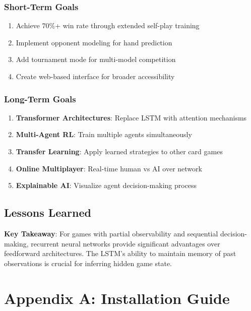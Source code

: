 \documentclass[12pt,a4paper]{article}
\begin{document}
\subsubsection{Short-Term Goals}
\begin{enumerate}
    \item Achieve 70\%+ win rate through extended self-play training
    \item Implement opponent modeling for hand prediction
    \item Add tournament mode for multi-model competition
    \item Create web-based interface for broader accessibility
\end{enumerate}
\subsubsection{Long-Term Goals}
\begin{enumerate}
    \item \textbf{Transformer Architectures}: Replace LSTM with attention mechanisms
    \item \textbf{Multi-Agent RL}: Train multiple agents simultaneously
    \item \textbf{Transfer Learning}: Apply learned strategies to other card games
    \item \textbf{Online Multiplayer}: Real-time human vs AI over network
    \item \textbf{Explainable AI}: Visualize agent decision-making process
\end{enumerate}
\subsection{Lessons Learned}
\begin{importantbox}
\textbf{Key Takeaway}: For games with partial observability and sequential decision-making, recurrent neural networks provide significant advantages over feedforward architectures. The LSTM's ability to maintain memory of past observations is crucial for inferring hidden game state.
\end{importantbox}
\newpage
\section*{Appendix A: Installation Guide}
\end{document}
